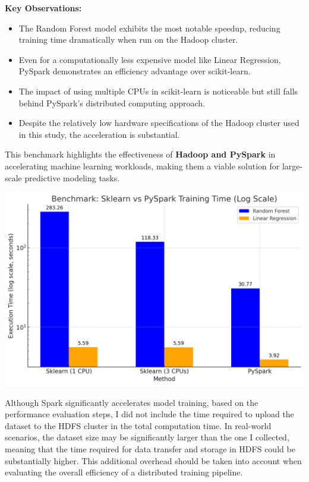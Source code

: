 \documentclass[12pt,a4paper]{article}
\begin{document}
\begin{multicols}{2}
\textbf{Key Observations:}  
\begin{itemize}
    \item The Random Forest model exhibits the most notable speedup, reducing training time dramatically when run on the Hadoop cluster.
    \item Even for a computationally less expensive model like Linear Regression, PySpark demonstrates an efficiency advantage over scikit-learn.
    \item The impact of using multiple CPUs in scikit-learn is noticeable but still falls behind PySpark's distributed computing approach.
    \item Despite the relatively low hardware specifications of the Hadoop cluster used in this study, the acceleration is substantial.
\end{itemize}

This benchmark highlights the effectiveness of \textbf{Hadoop and PySpark} in accelerating machine learning workloads, making them a viable solution for large-scale predictive modeling tasks.

\includegraphics[width=\linewidth]{Benchmark.png}
\label{fig:Benchmark}

Although Spark significantly accelerates model training, based on the performance evaluation steps, I did not include the time required to upload the dataset to the HDFS cluster in the total computation time. In real-world scenarios, the dataset size may be significantly larger than the one I collected, meaning that the time required for data transfer and storage in HDFS could be substantially higher. This additional overhead should be taken into account when evaluating the overall efficiency of a distributed training pipeline.

\end{multicols}
\end{document}
